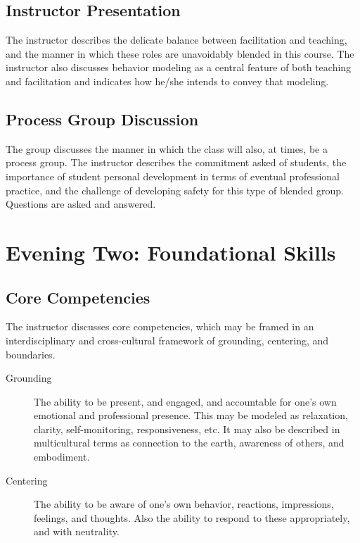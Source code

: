 \documentclass[12pt,DIV7,oneside,tocindent,headsepline]{scrbook}
\begin{document}
\subsection{Instructor Presentation}  
The instructor describes the delicate balance between facilitation and teaching, and the manner in which these roles are unavoidably blended in this course. The instructor also discusses behavior modeling as a central feature of both teaching and facilitation and indicates how he/she intends to convey that modeling.  

\subsection{Process Group Discussion}  
The group discusses the manner in which the class will also, at times, be a process group. The instructor describes the commitment asked of students, the importance of student personal development in terms of eventual professional practice, and the challenge of developing safety for this type of blended group. Questions are asked and answered.

\section{Evening Two: Foundational Skills}  
\subsection{Core Competencies}  
The instructor discusses core competencies, which may be framed in an interdisciplinary and cross-cultural framework of grounding, centering, and boundaries.  
\begin{description} 
\item[Grounding]
The ability to be present, and engaged, and accountable for one's own emotional and professional presence. This may be modeled as relaxation, clarity, self-monitoring, responsiveness, etc. It may also be described in multicultural terms as connection to the earth, awareness of others, and embodiment. \end{description} 

\begin{description} 
\item[Centering] 
The ability to be aware of one's own behavior, reactions, impressions, feelings, and thoughts. Also the ability to respond to these appropriately, and with neutrality. \end{description} 
\end{document}

